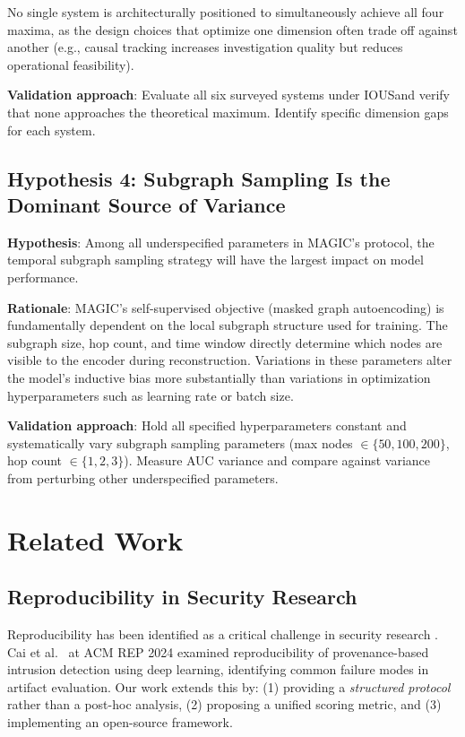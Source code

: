 \documentclass[11pt,a4paper]{article}
\newcommand{\ious}{\textsc{IOUS}}
\begin{document}
No single system is architecturally positioned to simultaneously achieve all four maxima, as the design choices that optimize one dimension often trade off against another (e.g., causal tracking increases investigation quality but reduces operational feasibility).

\textbf{Validation approach}: Evaluate all six surveyed systems under \ious and verify that none approaches the theoretical maximum. Identify specific dimension gaps for each system.

\subsection{Hypothesis 4: Subgraph Sampling Is the Dominant Source of Variance}

\textbf{Hypothesis}: Among all underspecified parameters in MAGIC's protocol, the temporal subgraph sampling strategy will have the largest impact on model performance.

\textbf{Rationale}: MAGIC's self-supervised objective (masked graph autoencoding) is fundamentally dependent on the local subgraph structure used for training. The subgraph size, hop count, and time window directly determine which nodes are visible to the encoder during reconstruction. Variations in these parameters alter the model's inductive bias more substantially than variations in optimization hyperparameters such as learning rate or batch size.

\textbf{Validation approach}: Hold all specified hyperparameters constant and systematically vary subgraph sampling parameters (max nodes $\in \{50, 100, 200\}$, hop count $\in \{1, 2, 3\}$). Measure AUC variance and compare against variance from perturbing other underspecified parameters.

\section{Related Work}
\label{sec:related}

\subsection{Reproducibility in Security Research}

Reproducibility has been identified as a critical challenge in security research \cite{geer2014reproducibility}. Cai et al.\ \cite{cai2024reproducibility} at ACM REP 2024 examined reproducibility of provenance-based intrusion detection using deep learning, identifying common failure modes in artifact evaluation. Our work extends this by: (1) providing a \emph{structured protocol} rather than a post-hoc analysis, (2) proposing a unified scoring metric, and (3) implementing an open-source framework.
\end{document}
